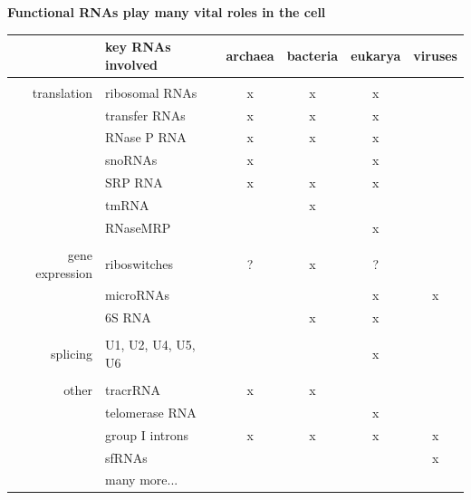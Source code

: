 \documentclass[landscape]{slides}
\begin{document}
\begin{slide}
\begin{center}
\textbf{Functional RNAs play many vital roles in the cell}
\end{center}
\medskip

\small
\begin{center}
\begin{tabular}{r|l|cccc}
 & key RNAs involved & archaea & bacteria & eukarya & viruses \\ \hline
 & \\ 
translation & ribosomal RNAs & x & x & x & \\
            & transfer RNAs  & x & x & x & \\
            & RNase P RNA    & x & x & x & \\
            & snoRNAs        & x &   & x & \\ 
            & SRP RNA        & x & x & x & \\ 
            & tmRNA          &   & x &   & \\ 
            & RNaseMRP       &   &   & x & \\ 
            &  \\ 
gene expression & riboswitches & ? & x & ? & \\
                & microRNAs &  & & x & x \\
                & 6S RNA & & x & x & \\ 
                & \\ 
splicing        & U1, U2, U4, U5, U6 & & & x & \\ 
                & \\
other           & tracrRNA       & x & x & \\
                & telomerase RNA & & & x & \\ 
                & group I introns& x & x & x & x \\
                & sfRNAs       & & & & x \\
                & many more... & & & \\ 
\end{tabular}
\end{center}

\vfill
\end{slide}
\end{document}
